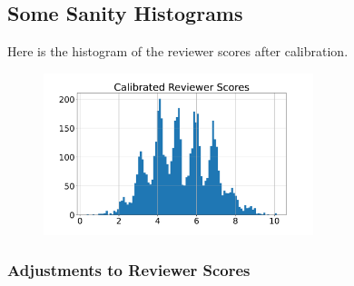 \hypertarget{some-sanity-histograms}{%
\subsection{Some Sanity Histograms}\label{some-sanity-histograms}}

\begin{flushright}
\end{flushright}

Here is the histogram of the reviewer scores after calibration.

\begin{Shaded}
\begin{Highlighting}[]
\OperatorTok{=}\OperatorTok{=}
\OperatorTok{=}\OperatorTok{=}
\NormalTok{\_ }\OperatorTok{=}\NormalTok{)}
\OperatorTok{=}\OperatorTok{=}\NormalTok{)}
\end{Highlighting}
\end{Shaded}

\begin{figure}[htb]
\includegraphics[width=0.70\textwidth]{diagrams/neurips/calibrated-reviewer-scores.pdf}


\caption{}
\label{calibrated-reviewer-scores}
\end{figure}

\hypertarget{adjustments-to-reviewer-scores}{%
\subsubsection{Adjustments to Reviewer
Scores}\label{adjustments-to-reviewer-scores}}

